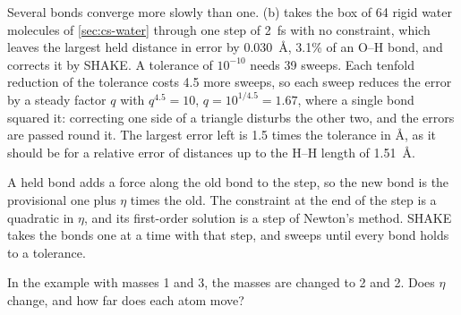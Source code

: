 Several bonds converge more slowly than one. (b) takes
the box of 64 rigid water molecules of \cref{sec:cs-water} through one
step of \SI{2}{\femto\second} with no constraint, which leaves the
largest held distance in error by \SI{0.030}{\angstrom}, 3.1\% of an O--H
bond, and corrects it by SHAKE. A tolerance of $10^{-10}$ needs 39 sweeps.
Each tenfold reduction of the tolerance costs 4.5 more sweeps, so each
sweep reduces the error by a steady factor $q$ with $q^{4.5} = 10$, $q =
10^{1/4.5} = 1.67$, where a
single bond squared it: correcting one side of a triangle disturbs the
other two, and the errors are passed round it. The largest error left is
1.5 times the tolerance in \si{\angstrom}, as it should be for a relative
error of distances up to the H--H length of \SI{1.51}{\angstrom}.

\begin{keyidea}
A held bond adds a force along the old bond to the step, so the new bond
is the provisional one plus $\eta$ times the old. The constraint at the
end of the step is a quadratic in $\eta$, and its first-order solution is
a step of Newton's method. SHAKE takes the bonds one at a time with that
step, and sweeps until every bond holds to a tolerance.
\end{keyidea}


\begin{selfcheck}
In the example with masses 1 and 3, the masses are changed to 2 and 2.
Does $\eta$ change, and how far does each atom move?
\end{selfcheck}

